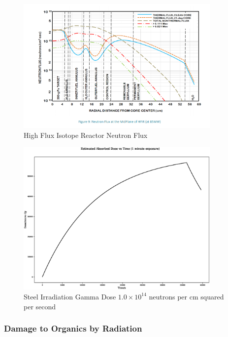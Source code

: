 \begin{figure}
  \begin{center}
    \includegraphics[width=10.0cm]{chapters/consequences_of_ionizing_radiation/images/HFIR_neutron_spectra_guide.png}
    \caption{High Flux Isotope Reactor Neutron Flux}
    \label{fig:hfir_neutron_flux}
  \end{center}
\end{figure}


\begin{figure}
  \begin{center}
    \includegraphics[width=10.0cm]{chapters/consequences_of_ionizing_radiation/neutron_plots/2/gamma_dose.eps}
    \caption{Steel Irradiation Gamma Dose $1.0 \times 10^{14}$ neutrons per cm squared per second}
    \label{fig:neutron_irradiated_steel_dose2}
  \end{center}
\end{figure}


\FloatBarrier

\subsubsection{Damage to Organics by Radiation}

